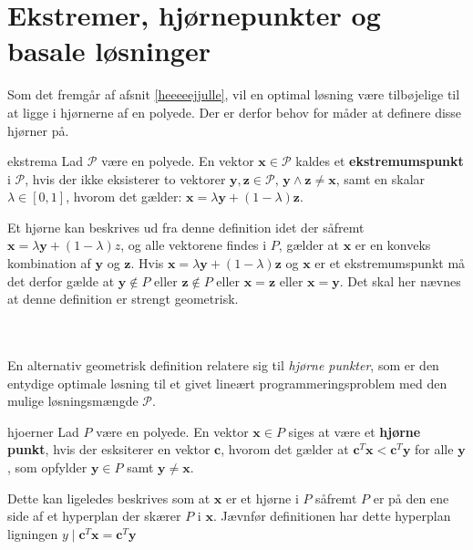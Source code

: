 \section{Ekstremer, hjørnepunkter og basale løsninger}
%
Som det fremgår af afsnit \ref{heeeeejjulle}, vil en optimal løsning være tilbøjelige til at ligge i hjørnerne af en polyede.
Der er derfor behov for måder at definere disse hjørner på.
%
\begin{defn}{}{ekstrema}
Lad $\mathcal{P}$ være en polyede. 
En vektor $\mathbf{x} \in \mathcal{P}$ kaldes et \textbf{ekstremumspunkt} i $\mathcal{P}$, hvis der ikke eksisterer to vektorer $\mathbf{y},\mathbf{z} \in \mathcal{P}$, $\mathbf{y} \land \mathbf{z} \neq \mathbf{x}$, 
samt en skalar $\lambda \in [0,1]$, hvorom det gælder: $\mathbf{x}=\lambda\mathbf{y}+(1-\lambda)\textbf{z}$.
\end{defn}
\noindent
%
%
Et hjørne kan beskrives ud fra denne definition idet der såfremt $\mathbf{x}=\lambda\mathbf{y}+(1-\lambda)z$, og alle vektorene findes i $P$, gælder at $\mathbf{x}$ er en konveks kombination af $\mathbf{y}$ og $\mathbf{z}$.
Hvis $\mathbf{x}=\lambda\mathbf{y}+(1-\lambda)\textbf{z}$ og $\mathbf{x}$ er et ekstremumspunkt må det derfor gælde at $\mathbf{y}\notin P$ eller $\mathbf{z}\notin P$ eller $\mathbf{x}=\mathbf{z}$ eller $\mathbf{x}=\mathbf{y}$. 
Det skal her nævnes at denne definition er strengt geometrisk.
%

\\\\
%
En alternativ geometrisk definition relatere sig til \textit{hjørne punkter}, som er den entydige optimale løsning til et givet lineært programmeringsproblem med den mulige løsningsmængde $\mathcal{P}$.
%
\begin{defn}{}{hjoerner}
Lad $P$ være en polyede. 
En vektor $\mathbf{x}\in P$ siges at være et \textbf{hjørne punkt}, hvis der esksiterer en vektor $\mathbf{c}$, hvorom det gælder at $\mathbf{c}^T\mathbf{x}<\mathbf{c}^T\mathbf{y}$ for alle $\mathbf{y}$, som opfylder $\mathbf{y} \in P$ samt $\mathbf{y}\neq\mathbf{x}$.
\end{defn}
\noindent
%
%
Dette kan ligeledes beskrives som at $\mathbf{x}$ er et hjørne i $P$ såfremt $P$ er på den ene side af et hyperplan der skærer $P$ i $\mathbf{x}$. 
Jævnfør definitionen har dette hyperplan ligningen $y \mid \mathbf{c}^T\mathbf{x}=\mathbf{c}^T\mathbf{y}$